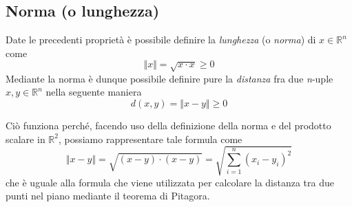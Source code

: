 		\subsection{Norma (o lunghezza)}
			Date le precedenti proprietà è possibile definire la \textit{lunghezza} (o \textit{norma}) di $ x \in \mathbb{R}^n $ come
			$$ \Vert x \Vert = \sqrt{x \cdot x} \geq 0 $$
			Mediante la norma è dunque possibile definire pure la \textit{distanza} fra due \textit{n}-uple $x, y \in \mathbb{R}^n$ nella seguente maniera
			$$ d(x, y) = \Vert x - y \Vert \geq 0 $$
			\begin{GrayBox}
				Ciò funziona perché, facendo uso della definizione della norma e del prodotto scalare in $\mathbb{R}^2$, possiamo rappresentare tale formula come
				$$ \Vert x - y \Vert = \sqrt{(x - y)\cdot(x - y)} = \sqrt{\sum_{i=1}^{n}(x_i - y_i)^2} $$
				che è uguale alla formula che viene utilizzata per calcolare la distanza tra due punti nel piano mediante il teorema di Pitagora.
			\end{GrayBox}
		
